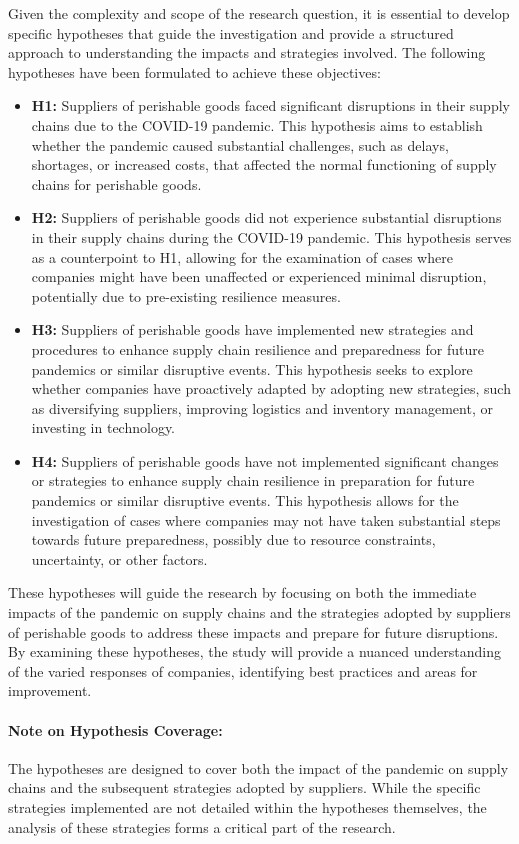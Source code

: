 Given the complexity and scope of the research question, it is essential to develop specific hypotheses that guide the investigation and provide a structured approach to understanding the impacts and strategies involved. The following hypotheses have been formulated to achieve these objectives:

\begin{itemize}
    \item \textbf{H1:} Suppliers of perishable goods faced significant disruptions in their supply chains due to the COVID-19 pandemic. This hypothesis aims to establish whether the pandemic caused substantial challenges, such as delays, shortages, or increased costs, that affected the normal functioning of supply chains for perishable goods.
    
    \item \textbf{H2:} Suppliers of perishable goods did not experience substantial disruptions in their supply chains during the COVID-19 pandemic. This hypothesis serves as a counterpoint to H1, allowing for the examination of cases where companies might have been unaffected or experienced minimal disruption, potentially due to pre-existing resilience measures.

    \item \textbf{H3:} Suppliers of perishable goods have implemented new strategies and procedures to enhance supply chain resilience and preparedness for future pandemics or similar disruptive events. This hypothesis seeks to explore whether companies have proactively adapted by adopting new strategies, such as diversifying suppliers, improving logistics and inventory management, or investing in technology.

    \item \textbf{H4:} Suppliers of perishable goods have not implemented significant changes or strategies to enhance supply chain resilience in preparation for future pandemics or similar disruptive events. This hypothesis allows for the investigation of cases where companies may not have taken substantial steps towards future preparedness, possibly due to resource constraints, uncertainty, or other factors.
\end{itemize}

These hypotheses will guide the research by focusing on both the immediate impacts of the pandemic on supply chains and the strategies adopted by suppliers of perishable goods to address these impacts and prepare for future disruptions. By examining these hypotheses, the study will provide a nuanced understanding of the varied responses of companies, identifying best practices and areas for improvement.

\paragraph*{\textbf{Note on Hypothesis Coverage:}} The hypotheses are designed to cover both the impact of the pandemic on supply chains and the subsequent strategies adopted by suppliers. While the specific strategies implemented are not detailed within the hypotheses themselves, the analysis of these strategies forms a critical part of the research.
